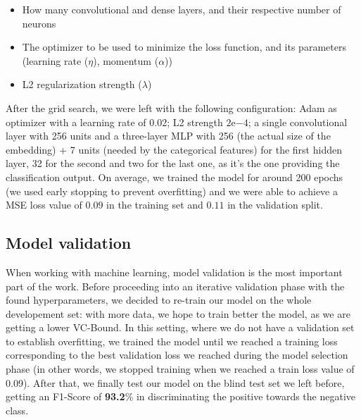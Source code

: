\documentclass{article}
\begin{document}
\begin{multicols}{2}
\begin{itemize}
    \item How many convolutional and dense layers, and their respective number of neurons
    \item The optimizer to be used to minimize the loss function, and its parameters (learning rate ($\eta$), momentum ($\alpha$))
    \item L2 regularization strength ($\lambda$)
\end{itemize}

After the grid search, we were left with the following configuration: Adam as optimizer with a learning rate of 0.02; L2 strength $2\mathrm{e}{-4}$; a single convolutional layer with 256 units and a three-layer MLP with 256 (the actual size of the embedding) + 7 units (needed by the categorical features) for the first hidden layer, 32 for the second and two for the last one, as it's the one providing the classification output. On average, we trained the model for around 200 epochs (we used early stopping to prevent overfitting) and we were able to achieve a MSE loss value of $0.09$ in the training set and $0.11$ in the validation split.

\subsection{Model validation}
When working with machine learning, model validation is the most important part of the work. Before proceeding into an iterative validation phase with the found hyperparameters, we decided to re-train our model on the whole developement set: with more data, we hope to train better the model, as we are getting a lower VC-Bound. In this setting, where we do not have a validation set to establish overfitting, we trained the model until we reached a training loss corresponding to the best validation loss we reached during the model selection phase (in other words, we stopped training when we reached a train loss value of 0.09). After that, we finally test our model on the blind test set we left before, getting an F1-Score of \textbf{93.2}\% in discriminating the positive towards the negative class. 


\end{multicols}
\end{document}
